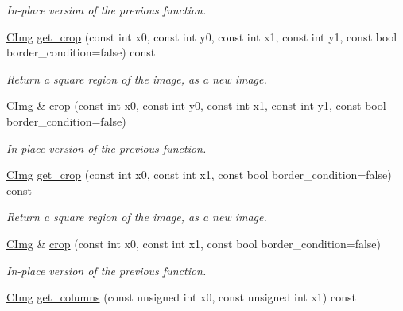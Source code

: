 \begin{DoxyCompactItemize}
\begin{DoxyCompactList}\small\item\em In-\/place version of the previous function. \end{DoxyCompactList}\item 
\hyperlink{structcimg__library_1_1_c_img}{C\-Img} \hyperlink{structcimg__library_1_1_c_img_a47003219094a45a26652d2b944365c91}{get\-\_\-crop} (const int x0, const int y0, const int x1, const int y1, const bool border\-\_\-condition=false) const 
\begin{DoxyCompactList}\small\item\em Return a square region of the image, as a new image. \end{DoxyCompactList}\item 
\hypertarget{structcimg__library_1_1_c_img_ac30c8920140951a6be995bfa7f113a20}{\hyperlink{structcimg__library_1_1_c_img}{C\-Img} \& \hyperlink{structcimg__library_1_1_c_img_ac30c8920140951a6be995bfa7f113a20}{crop} (const int x0, const int y0, const int x1, const int y1, const bool border\-\_\-condition=false)}\label{structcimg__library_1_1_c_img_ac30c8920140951a6be995bfa7f113a20}

\begin{DoxyCompactList}\small\item\em In-\/place version of the previous function. \end{DoxyCompactList}\item 
\hyperlink{structcimg__library_1_1_c_img}{C\-Img} \hyperlink{structcimg__library_1_1_c_img_a125f975972d8b460f9375711427b4789}{get\-\_\-crop} (const int x0, const int x1, const bool border\-\_\-condition=false) const 
\begin{DoxyCompactList}\small\item\em Return a square region of the image, as a new image. \end{DoxyCompactList}\item 
\hypertarget{structcimg__library_1_1_c_img_a35ce9e82583553c28f884398eea0c85c}{\hyperlink{structcimg__library_1_1_c_img}{C\-Img} \& \hyperlink{structcimg__library_1_1_c_img_a35ce9e82583553c28f884398eea0c85c}{crop} (const int x0, const int x1, const bool border\-\_\-condition=false)}\label{structcimg__library_1_1_c_img_a35ce9e82583553c28f884398eea0c85c}

\begin{DoxyCompactList}\small\item\em In-\/place version of the previous function. \end{DoxyCompactList}\item 
\hypertarget{structcimg__library_1_1_c_img_a630db2b45e12cecc5074abcd5af08a6a}{\hyperlink{structcimg__library_1_1_c_img}{C\-Img} \hyperlink{structcimg__library_1_1_c_img_a630db2b45e12cecc5074abcd5af08a6a}{get\-\_\-columns} (const unsigned int x0, const unsigned int x1) const }\label{structcimg__library_1_1_c_img_a630db2b45e12cecc5074abcd5af08a6a}


\end{DoxyCompactItemize}
